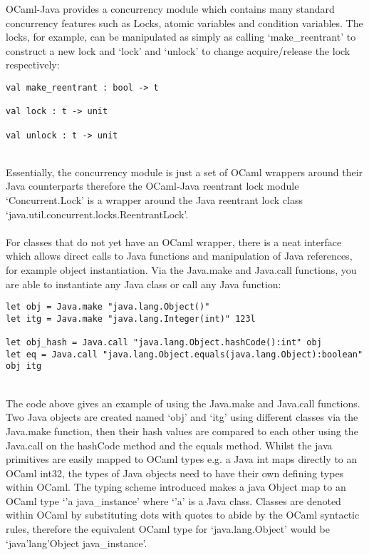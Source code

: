 \documentclass[12pt,twoside,notitlepage]{report}
\begin{document}
%
%
OCaml-Java provides a concurrency module which contains many standard concurrency features such as Locks, atomic variables and condition variables. The locks, for example, can be manipulated as simply as calling `make\_reentrant' to
construct a new lock and `lock' and `unlock' to change acquire/release the lock respectively:
\\
\begin{lstlisting}[frame=single]
val make_reentrant : bool -> t

val lock : t -> unit

val unlock : t -> unit
\end{lstlisting}
\hfill\\
Essentially, the concurrency module is just a set of OCaml wrappers around their Java counterparts\cite{web:clerc2013} therefore the OCaml-Java reentrant lock module `Concurrent.Lock' is a wrapper around the Java reentrant lock class
`java.util.concurrent.locks.ReentrantLock'.
\\
\\
%
%
For classes that do not yet have an OCaml wrapper, there is a neat interface which allows direct calls to Java functions and manipulation of Java references, for example object instantiation. Via the Java.make and Java.call functions,
you are able to instantiate any Java class or call any Java function:
\\
\begin{lstlisting}[frame=single]
let obj = Java.make "java.lang.Object()"
let itg = Java.make "java.lang.Integer(int)" 123l

let obj_hash = Java.call "java.lang.Object.hashCode():int" obj
let eq = Java.call "java.lang.Object.equals(java.lang.Object):boolean" obj itg
\end{lstlisting}
\hfill\\
The code above gives an example of using the Java.make and Java.call functions. Two Java objects are created named `obj' and `itg' using different classes via the Java.make function, then their hash values are compared to each other
using the Java.call on the hashCode method and the equals method. Whilst the java primitives are easily mapped to OCaml types e.g. a Java int maps directly to an OCaml int32, the types of Java objects need to have their own defining
types within OCaml. The typing scheme introduced makes a java Object map to an OCaml type `'a java\_instance' where `'a' is a Java class. Classes are denoted within OCaml by substituting dots with quotes to abide by the OCaml
syntactic rules\cite{web:clerc2013}, therefore the equivalent OCaml type for `java.lang.Object' would be `java'lang'Object java\_instance'.
\\
\\
\end{document}
